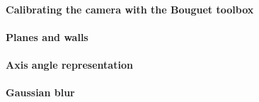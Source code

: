 \paragraph{Calibrating the camera with the Bouguet toolbox}
%  
%  
%  
%  
%  
\paragraph{Planes and walls}
%  
\paragraph{Axis angle representation}
%  
\paragraph{Gaussian blur}
